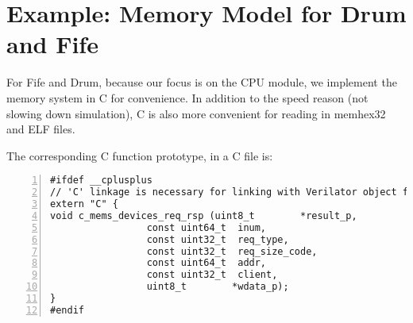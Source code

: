 \section{Example: Memory Model for Drum and Fife}

For Fife and Drum, because our focus is on the CPU module, we
implement the memory system in C for convenience.  In addition to the
speed reason (not slowing down simulation), C is also more convenient
for reading in memhex32 and ELF files.



The corresponding C function prototype, in a C file is:

{\small
\begin{Verbatim}[frame=single, numbers=left]
#ifdef __cplusplus
// 'C' linkage is necessary for linking with Verilator object files
extern "C" {
void c_mems_devices_req_rsp (uint8_t        *result_p,
			     const uint64_t  inum,
			     const uint32_t  req_type,
			     const uint32_t  req_size_code,
			     const uint64_t  addr,
			     const uint32_t  client,
			     uint8_t        *wdata_p);
}
#endif
\end{Verbatim}
}


